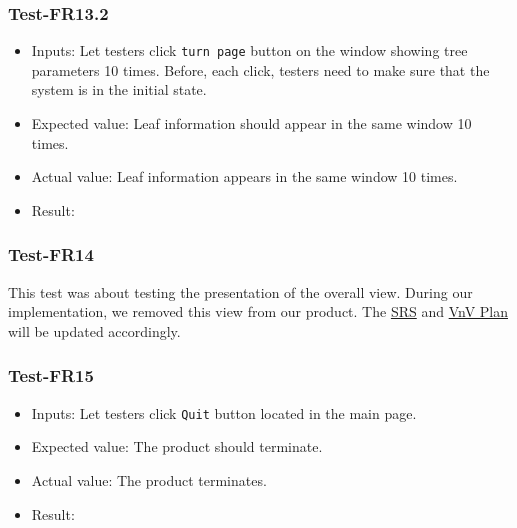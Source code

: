 \documentclass[12pt, titlepage]{article}
\begin{document}
\subsubsection{Test-FR13.2}
\begin{itemize}
    \item Inputs: Let testers click \verb|turn page| button on the window showing
    tree parameters 10 times. Before, each click, testers need to make sure that
    the system is in the initial state.
    \item Expected value: Leaf information should appear in the same window 10 times.
    \item Actual value: Leaf information appears in the same window 10 times.
    \item Result: \pass
\end{itemize}

\subsubsection{Test-FR14}
This test was about testing the presentation of the overall view. During our implementation, we removed this view from our product. The 
\href{https://github.com/wuj187/DigitalTwinCAS/blob/main/docs/SRS/SRS.pdf}{SRS}
and \href{https://github.com/wuj187/DigitalTwinCAS/blob/main/docs/VnVPlan/VnVPlan.pdf}{VnV Plan} will be updated accordingly.

\subsubsection{Test-FR15}
\begin{itemize}
    \item Inputs: Let testers click \verb|Quit| button located in the main page.
    \item Expected value: The product should terminate.
    \item Actual value: The product terminates.
    \item Result: \pass
\end{itemize}

\end{document}
